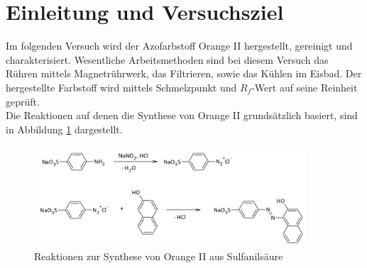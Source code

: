 \section{Einleitung und Versuchsziel}
\label{sec:aufgabenstellung}

Im folgenden Versuch wird der Azofarbstoff Orange II hergestellt, gereinigt und charakterisiert. Wesentliche Arbeitsmethoden sind bei diesem Versuch das Rühren mittels Magnetrührwerk, das Filtrieren, sowie das Kühlen im Eisbad. Der hergestellte Farbstoff wird mittels Schmelzpunkt und $R_f$-Wert auf seine Reinheit geprüft.\\
Die Reaktionen auf denen die Synthese von Orange II grundsätzlich basiert, sind in Abbildung \ref{fig:reaktion} dargestellt.

\begin{figure}[h!]
	\centering
	\includegraphics[width=0.9\textwidth]{img/reaktion}
	\caption{Reaktionen zur Synthese von Orange II aus Sulfanilsäure}
	\label{fig:reaktion}
\end{figure}
\FloatBarrier
